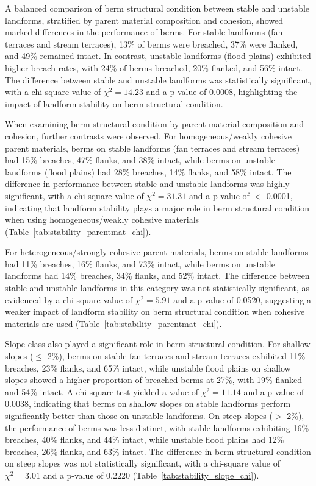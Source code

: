 \documentclass[review]{elsarticle}
\begin{document}
A balanced comparison of berm structural condition between stable and unstable landforms, stratified by parent material composition and cohesion, showed marked differences in the performance of berms. For stable landforms (fan terraces and stream terraces), 13\% of berms were breached, 37\% were flanked, and 49\% remained intact. In contrast, unstable landforms (flood plains) exhibited higher breach rates, with 24\% of berms breached, 20\% flanked, and 56\% intact. The difference between stable and unstable landforms was statistically significant, with a chi-square value of $\chi^2 = 14.23$ and a p-value of 0.0008, highlighting the impact of landform stability on berm structural condition.

When examining berm structural condition by parent material composition and cohesion, further contrasts were observed. For homogeneous/weakly cohesive parent materials, berms on stable landforms (fan terraces and stream terraces) had 15\% breaches, 47\% flanks, and 38\% intact, while berms on unstable landforms (flood plains) had 28\% breaches, 14\% flanks, and 58\% intact. The difference in performance between stable and unstable landforms was highly significant, with a chi-square value of $\chi^2 = 31.31$ and a p-value of $<$ 0.0001, indicating that landform stability plays a major role in berm structural condition when using homogeneous/weakly cohesive materials (Table~\ref{tab:stability_parentmat_chi}).

For heterogeneous/strongly cohesive parent materials, berms on stable landforms had 11\% breaches, 16\% flanks, and 73\% intact, while berms on unstable landforms had 14\% breaches, 34\% flanks, and 52\% intact. The difference between stable and unstable landforms in this category was not statistically significant, as evidenced by a chi-square value of $\chi^2 = 5.91$ and a p-value of 0.0520, suggesting a weaker impact of landform stability on berm structural condition when cohesive materials are used (Table~\ref{tab:stability_parentmat_chi}).

Slope class also played a significant role in berm structural condition. For shallow slopes ($\leq$ 2\%), berms on stable fan terraces and stream terraces exhibited 11\% breaches, 23\% flanks, and 65\% intact, while unstable flood plains on shallow slopes showed a higher proportion of breached berms at 27\%, with 19\% flanked and 54\% intact. A chi-square test yielded a value of $\chi^2 = 11.14$ and a p-value of 0.0038, indicating that berms on shallow slopes on stable landforms perform significantly better than those on unstable landforms. On steep slopes ($>$ 2\%), the performance of berms was less distinct, with stable landforms exhibiting 16\% breaches, 40\% flanks, and 44\% intact, while unstable flood plains had 12\% breaches, 26\% flanks, and 63\% intact. The difference in berm structural condition on steep slopes was not statistically significant, with a chi-square value of $\chi^2 = 3.01$ and a p-value of 0.2220 (Table~\ref{tab:stability_slope_chi}).
\end{document}
